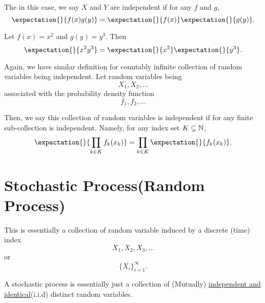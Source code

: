 The in this case, we say \(X\) and \(Y\) are independent if for any \(f\) and \(g\),
\[
	\expectation{}{f(x)g(y)} = \expectation{}{f(x)}\expectation{}{g(y)}.
\]
\begin{eg}
	Let \(f(x) = x^2\) and \(g(y) = y^3\). Then
	\[
		\expectation{}{x^2 y^3} = \expectation{}{x^2} \expectation{}{y^3}.
	\]
\end{eg}

Again, we have similar definition for countably infinite collection of random variables being independent. Let random variables being
\[
	X_1, X_2, \ldots
\]
associated with the probability density function
\[
	f_1, f_2, \ldots
\]

Then, we say this collection of random variables is independent if for any finite sub-collection is independent. Namely, for any index set \(K\subsetneq\mathbb{\MakeUppercase{N}}\),
\[
	\expectation{}{\prod\limits_{k\in K} f_k(x_k)} = \prod\limits_{k\in K} \expectation{}{f_k(x_k)}.
\]


\section{Stochastic Process(Random Process)}
This is essentially a collection of random variable induced by a discrete (time) index
\[
	X_1, X_2, X_3, \ldots
\]
or
\[
	\{X_i\}_{i = 1}^{\infty }.
\]

\begin{intuition}
	A stochastic process is essentially just a collection of (Mutually) \underline{independent and identical}(i.i.d) distinct random variables.
\end{intuition}

